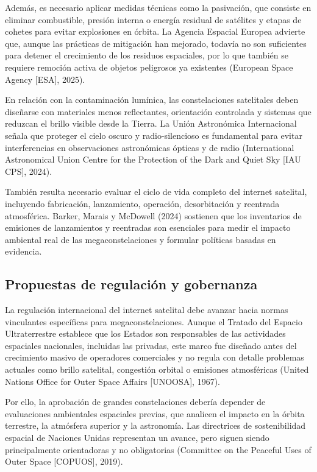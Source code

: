 Además, es necesario aplicar medidas técnicas como la pasivación, que consiste en eliminar combustible, presión interna o energía residual de satélites y etapas de cohetes para evitar explosiones en órbita. La Agencia Espacial Europea advierte que, aunque las prácticas de mitigación han mejorado, todavía no son suficientes para detener el crecimiento de los residuos espaciales, por lo que también se requiere remoción activa de objetos peligrosos ya existentes (European Space Agency [ESA], 2025).

En relación con la contaminación lumínica, las constelaciones satelitales deben diseñarse con materiales menos reflectantes, orientación controlada y sistemas que reduzcan el brillo visible desde la Tierra. La Unión Astronómica Internacional señala que proteger el cielo oscuro y radio-silencioso es fundamental para evitar interferencias en observaciones astronómicas ópticas y de radio (International Astronomical Union Centre for the Protection of the Dark and Quiet Sky [IAU CPS], 2024).

También resulta necesario evaluar el ciclo de vida completo del internet satelital, incluyendo fabricación, lanzamiento, operación, desorbitación y reentrada atmosférica. Barker, Marais y McDowell (2024) sostienen que los inventarios de emisiones de lanzamientos y reentradas son esenciales para medir el impacto ambiental real de las megaconstelaciones y formular políticas basadas en evidencia.

\subsection{Propuestas de regulación y gobernanza}

La regulación internacional del internet satelital debe avanzar hacia normas vinculantes específicas para megaconstelaciones. Aunque el Tratado del Espacio Ultraterrestre establece que los Estados son responsables de las actividades espaciales nacionales, incluidas las privadas, este marco fue diseñado antes del crecimiento masivo de operadores comerciales y no regula con detalle problemas actuales como brillo satelital, congestión orbital o emisiones atmosféricas (United Nations Office for Outer Space Affairs [UNOOSA], 1967).

Por ello, la aprobación de grandes constelaciones debería depender de evaluaciones ambientales espaciales previas, que analicen el impacto en la órbita terrestre, la atmósfera superior y la astronomía. Las directrices de sostenibilidad espacial de Naciones Unidas representan un avance, pero siguen siendo principalmente orientadoras y no obligatorias (Committee on the Peaceful Uses of Outer Space [COPUOS], 2019).

